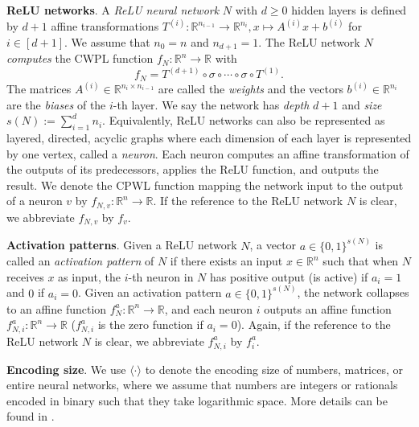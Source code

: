 \documentclass{article}
\renewcommand{\paragraph}[1]{\textbf{#1}.}
\begin{document}
\paragraph{ReLU networks}
A \emph{ReLU neural network} $N$ with $d\geq 0$ hidden layers is defined by $d+1$ affine transformations $T^{(i)}:\mathbb{R}^{n_{i-1}}\to \mathbb{R}^{n_i}, x\mapsto A^{(i)}x+b^{(i)}$ for $i\in [d+1]$.
We assume that $n_0=n$ and $n_{d+1}=1$.
The ReLU network $N$ \emph{computes} the CWPL function $f_N:\mathbb{R}^n\to \mathbb{R}$ with
\[
f_N=T^{(d+1)}\circ \sigma \circ \cdots \circ \sigma \circ T^{(1)}.
\]
The matrices $A^{(i)}\in \mathbb{R}^{n_i\times n_{i-1}}$ are called the \emph{weights} and the vectors $b^{(i)}\in \mathbb{R}^{n_i}$ are the \emph{biases} of the $i$-th layer.
We say the network has \emph{depth} $d+1$ and \emph{size} $s(N) := \sum_{i=1}^d n_i$.
Equivalently, ReLU networks can also be represented as layered, directed, acyclic graphs where each dimension of each layer is represented by one vertex, called a \emph{neuron}.
Each neuron computes an affine transformation of the outputs of its predecessors, applies the ReLU function, and outputs the result. We denote the CPWL function mapping the network input to the output of a neuron $v$ by $f_{N,v}:\mathbb{R}^n\to \mathbb{R}$. If the reference to the ReLU network $N$ is clear, we abbreviate $f_{N,v}$ by $f_v$.

\paragraph{Activation patterns}
Given a ReLU network $N$, a vector $a \in \{0,1\}^{s(N)}$ is called an \emph{activation pattern} of $N$ if there exists an input $x \in \mathbb{R}^n$ such that when $N$ receives $x$ as input, the $i$-th neuron in $N$ has positive output (is active) if $a_i=1$ and $0$ if $a_i=0$.
Given an activation pattern $a\in\{0,1\}^{s(N)}$, the network collapses to an affine function $f_N^a:\mathbb{R}^n\to \mathbb{R}$, and each neuron $i$ outputs an affine function $f^a_{N,i}:\mathbb{R}^n\to \mathbb{R}$ ($f^a_{N,i}$ is the zero function if $a_i=0$).
Again, if the reference to the ReLU network $N$ is clear, we abbreviate $f^a_{N,i}$ by $f^a_i$.

\paragraph{Encoding size}
We use $\langle \cdot \rangle$ to denote the encoding size of numbers, matrices, or entire neural networks, where we assume that numbers are integers or rationals encoded in binary such that they take logarithmic space. More details can be found in .
\end{document}
